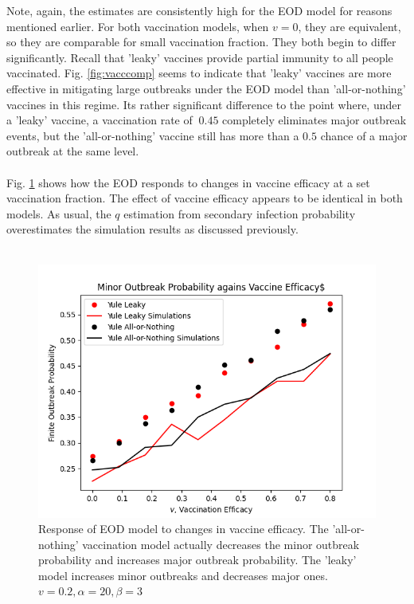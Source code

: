 \documentclass[11pt, twocolumn]{article}
\begin{document}
Note, again, the estimates are consistently high for the EOD model for reasons mentioned earlier. For both vaccination models, when $v=0$, they are equivalent, so they are comparable for small vaccination fraction. They both begin to differ significantly. Recall that 'leaky' vaccines provide partial immunity to all people vaccinated. Fig. \ref{fig:vacccomp} seems to indicate that 'leaky' vaccines are more effective in mitigating large outbreaks under the EOD model than 'all-or-nothing' vaccines in this regime. Its rather significant difference to the point where, under a 'leaky' vaccine, a vaccination rate of $~0.45$ completely eliminates major outbreak events, but the 'all-or-nothing' vaccine still has more than a $0.5$ chance of a major outbreak at the same level. \\ \\
Fig. \ref{fig:vacceffcomp} shows how the EOD responds to changes in vaccine efficacy at a set vaccination fraction. The effect of vaccine efficacy appears to be identical in both models. As usual, the $q$ estimation from secondary infection probability overestimates the simulation results as discussed previously. \\ \\
\begin{figure}
	\centering
	\includegraphics[scale=0.5]{YuleVaccEffComparison.png}
	\caption{Response of EOD model to changes in vaccine efficacy. The 'all-or-nothing' vaccination model actually decreases the minor outbreak probability and increases major outbreak probability. The 'leaky' model increases minor outbreaks and decreases major ones. $v=0.2, \alpha=20, \beta=3$}
	\label{fig:vacceffcomp}
\end{figure}
\end{document}
